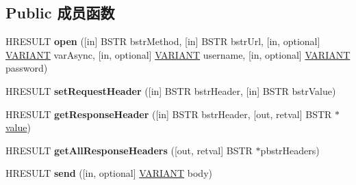 \subsection*{Public 成员函数}
\begin{DoxyCompactItemize}
\item 
\mbox{\label{interface_m_s_x_m_l2_1_1_i_x_m_l_h_t_t_p_request_ae3bc84e9f3251a47c95dcd7326da5963}} 
H\+R\+E\+S\+U\+LT {\bfseries open} (\mbox{[}in\mbox{]} B\+S\+TR bstr\+Method, \mbox{[}in\mbox{]} B\+S\+TR bstr\+Url, \mbox{[}in, optional\mbox{]} \hyperlink{structtag_v_a_r_i_a_n_t}{V\+A\+R\+I\+A\+NT} var\+Async, \mbox{[}in, optional\mbox{]} \hyperlink{structtag_v_a_r_i_a_n_t}{V\+A\+R\+I\+A\+NT} username, \mbox{[}in, optional\mbox{]} \hyperlink{structtag_v_a_r_i_a_n_t}{V\+A\+R\+I\+A\+NT} password)
\item 
\mbox{\label{interface_m_s_x_m_l2_1_1_i_x_m_l_h_t_t_p_request_a00cbfdde8955835d077bdd8dd2d85c89}} 
H\+R\+E\+S\+U\+LT {\bfseries set\+Request\+Header} (\mbox{[}in\mbox{]} B\+S\+TR bstr\+Header, \mbox{[}in\mbox{]} B\+S\+TR bstr\+Value)
\item 
\mbox{\label{interface_m_s_x_m_l2_1_1_i_x_m_l_h_t_t_p_request_af6a3a39333faafb5c348bef6da52388d}} 
H\+R\+E\+S\+U\+LT {\bfseries get\+Response\+Header} (\mbox{[}in\mbox{]} B\+S\+TR bstr\+Header, \mbox{[}out, retval\mbox{]} B\+S\+TR $\ast$\hyperlink{unionvalue}{value})
\item 
\mbox{\label{interface_m_s_x_m_l2_1_1_i_x_m_l_h_t_t_p_request_ac7ef7f39ab302a2a492acba0a66f2b5b}} 
H\+R\+E\+S\+U\+LT {\bfseries get\+All\+Response\+Headers} (\mbox{[}out, retval\mbox{]} B\+S\+TR $\ast$pbstr\+Headers)
\item 
\mbox{\label{interface_m_s_x_m_l2_1_1_i_x_m_l_h_t_t_p_request_a334a1cc5f473bcba29051f2984024d84}} 
H\+R\+E\+S\+U\+LT {\bfseries send} (\mbox{[}in, optional\mbox{]} \hyperlink{structtag_v_a_r_i_a_n_t}{V\+A\+R\+I\+A\+NT} body)
\item 
\mbox{\label{interface_m_s_x_m_l2_1_1_i_x_m_l_h_t_t_p_request_a70823553510730e7fba9e02bc352d387}} 

\end{DoxyCompactItemize}
